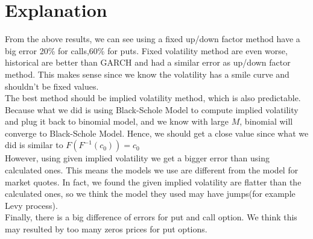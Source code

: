 \section{Explanation}
From the above results, we can see using a fixed up/down factor method have a big error 20\% for calls,60\% for puts. Fixed volatility method are even worse, historical are better than GARCH and had a similar error as up/down factor method. This makes sense since we know the volatility has a smile curve and shouldn't be fixed values.\\
The best method should be implied volatility method, which is also predictable. Because what we did is using Black-Schole Model to compute implied volatility and plug it back to binomial model, and we know with large $M$, binomial will converge to Black-Schole Model. Hence, we should get a close value since what we did is similar to $F(F^{-1}(c_0))=c_0$\\
However, using given implied volatility we get a bigger error than using calculated ones. This means the models we use are different from the model for market quotes. In fact, we found the given implied volatility are flatter than the calculated ones, so we think the model they used may have jumps(for example Levy process).\\
Finally, there is a big difference of errors for put and call option. We think this may resulted by too many zeros prices for put options.\\
\newpage
